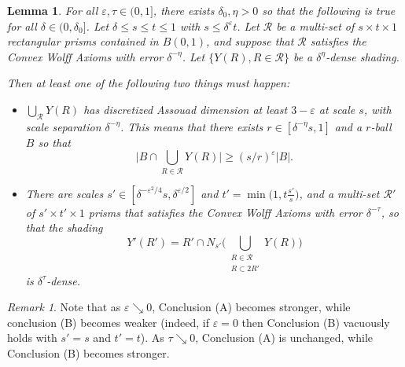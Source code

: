 \documentclass[letterpaper, reqno,11pt]{article}
\numberwithin{equation}{section}
\newcommand{\eps}{\varepsilon}
\numberwithin{thm}{section}
\newtheorem{lem}[thm]{Lemma}
\theoremstyle{remark}
\newtheorem{rem}[thm]{Remark}
\begin{document}
\begin{lem}\label{biggerRectDichotomy}
For all $\eps,\tau\in (0,1]$, there exists $\delta_0,\eta>0$ so that the following is true for all $\delta\in(0,\delta_0]$. Let $\delta\leq s\leq t\leq 1$ with $s\leq\delta^{\eps}t$. Let $\mathcal{R}$ be a multi-set of $s\times t\times 1$ rectangular prisms contained in $B(0,1)$, and suppose that $\mathcal{R}$ satisfies the Convex Wolff Axioms with error $\delta^{-\eta}$. Let $\{Y(R), R\in\mathcal{R}\}$ be a $\delta^{\eta}$-dense shading.

\noindent Then at least one of the following two things must happen:

\begin{itemize}
	\item[(A)] $\bigcup_{\mathcal{R}}Y(R)$ has discretized Assouad dimension at least $3-\eps$ at scale $s$, with scale separation $\delta^{-\eta}$. This means that there exists $r\in[\delta^{-\eta}s,1]$ and a $r$-ball $B$ so that
\begin{equation}\label{plankRhoRNbhdSameVolInDichotomy}
\Big| B \cap  \bigcup_{R\in\mathcal{R}}Y(R)\Big| \geq (s/r)^{\eps}|B|.
\end{equation}

\item[(B)] There are scales $s'\in [\delta^{-\eps^2/4}s,\delta^{\eps/2}]$ and $t'=\min\big(1, t\frac{s'}{s}\big)$, and a multi-set $\mathcal{R}'$ of $s' \times t'\times 1$ prisms that satisfies the Convex Wolff Axioms with error $\delta^{-\tau}$, so that the shading 
\begin{equation}\label{YPrimeRPrimeShading}
Y'(R')=R'\cap N_{s'}\Big(\bigcup_{\substack{R\in\mathcal{R}\\ R \subset 2R'}}Y(R)\Big)
\end{equation}
is $\delta^{\tau}$-dense. 
\end{itemize}
\end{lem}

\begin{rem}
Note that as $\eps\searrow 0$, Conclusion (A) becomes stronger, while conclusion (B) becomes weaker (indeed, if $\eps=0$ then Conclusion (B) vacuously holds with $s'=s$ and $t'=t$). As $\tau\searrow 0$, Conclusion (A) is unchanged, while Conclusion (B) becomes stronger. 
\end{rem}

\end{document}
